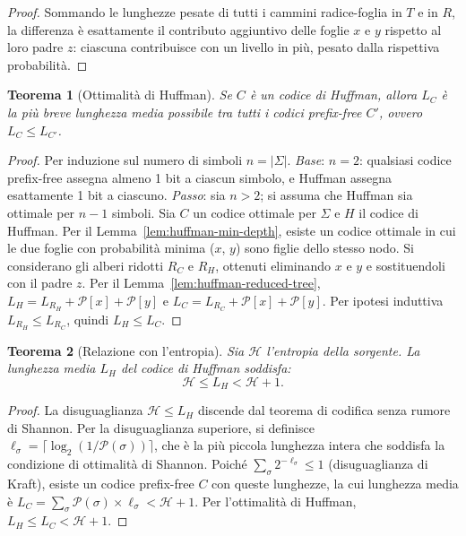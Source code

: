 \documentclass[12pt, a4paper, oneside]{book}
\theoremstyle{plain}
\newtheorem{teorema}{Teorema}[chapter]
\theoremstyle{definition}
\theoremstyle{remark}
\begin{document}
\begin{proof}
Sommando le lunghezze pesate di tutti i cammini radice-foglia in $T$ e in $R$, la differenza è esattamente il contributo aggiuntivo delle foglie $x$ e $y$ rispetto al loro padre $z$: ciascuna contribuisce con un livello in più, pesato dalla rispettiva probabilità.
\end{proof}

\begin{teorema}[Ottimalità di Huffman]
\label{thm:huffman-optimal}
Se $C$ è un codice di Huffman, allora $L_C$ è la più breve lunghezza media possibile tra tutti i codici prefix-free $C'$, ovvero $L_C \leq L_{C'}$.
\end{teorema}

\begin{proof}
Per induzione sul numero di simboli $n = |\Sigma|$. \emph{Base}: $n = 2$: qualsiasi codice prefix-free assegna almeno 1 bit a ciascun simbolo, e Huffman assegna esattamente 1 bit a ciascuno. \emph{Passo}: sia $n > 2$; si assuma che Huffman sia ottimale per $n - 1$ simboli. Sia $C$ un codice ottimale per $\Sigma$ e $H$ il codice di Huffman. Per il Lemma~\ref{lem:huffman-min-depth}, esiste un codice ottimale in cui le due foglie con probabilità minima ($x$, $y$) sono figlie dello stesso nodo. Si considerano gli alberi ridotti $R_C$ e $R_H$, ottenuti eliminando $x$ e $y$ e sostituendoli con il padre $z$. Per il Lemma~\ref{lem:huffman-reduced-tree}, $L_H = L_{R_H} + \mathcal{P}[x] + \mathcal{P}[y]$ e $L_C = L_{R_C} + \mathcal{P}[x] + \mathcal{P}[y]$. Per ipotesi induttiva $L_{R_H} \leq L_{R_C}$, quindi $L_H \leq L_C$.
\end{proof}

\begin{teorema}[Relazione con l'entropia]
\label{thm:huffman-entropy}
Sia $\mathcal{H}$ l'entropia della sorgente. La lunghezza media $L_H$ del codice di Huffman soddisfa:
\[
\mathcal{H} \leq L_H < \mathcal{H} + 1.
\]
\end{teorema}

\begin{proof}
La disuguaglianza $\mathcal{H} \leq L_H$ discende dal teorema di codifica senza rumore di Shannon. Per la disuguaglianza superiore, si definisce $\ell_\sigma = \lceil \log_2(1/\mathcal{P}(\sigma)) \rceil$, che è la più piccola lunghezza intera che soddisfa la condizione di ottimalità di Shannon. Poiché $\sum_{\sigma} 2^{-\ell_\sigma} \leq 1$ (disuguaglianza di Kraft), esiste un codice prefix-free $C$ con queste lunghezze, la cui lunghezza media è $L_C = \sum_\sigma \mathcal{P}(\sigma) \times \ell_\sigma < \mathcal{H} + 1$. Per l'ottimalità di Huffman, $L_H \leq L_C < \mathcal{H} + 1$.
\end{proof}
\end{document}
